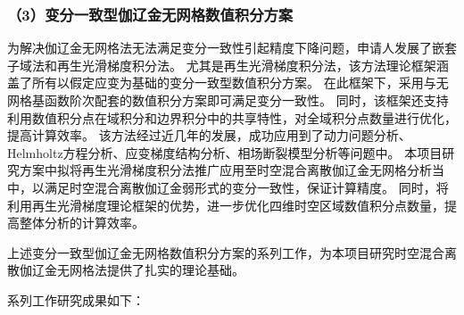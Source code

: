 \vspace{16pt}

\subsubsection*{\bfseries （3）变分一致型伽辽金无网格数值积分方案}
为解决伽辽金无网格法无法满足变分一致性引起精度下降问题，申请人发展了嵌套子域法和再生光滑梯度积分法。
尤其是再生光滑梯度积分法，该方法理论框架涵盖了所有以假定应变为基础的变分一致型数值积分方案。
在此框架下，采用与无网格基函数阶次配套的数值积分方案即可满足变分一致性。
同时，该框架还支持利用数值积分点在域积分和边界积分中的共享特性，对全域积分点数量进行优化，提高计算效率。
该方法经过近几年的发展，成功应用到了动力问题分析、Helmholtz方程分析、应变梯度结构分析、相场断裂模型分析等问题中。
本项目研究方案中拟将再生光滑梯度积分法推广应用至时空混合离散伽辽金无网格分析当中，以满足时空混合离散伽辽金弱形式的变分一致性，保证计算精度。
同时，将利用再生光滑梯度理论框架的优势，进一步优化四维时空区域数值积分点数量，提高整体分析的计算效率。

上述变分一致型伽辽金无网格数值积分方案的系列工作，为本项目研究时空混合离散伽辽金无网格法提供了扎实的理论基础。

系列工作研究成果如下：

